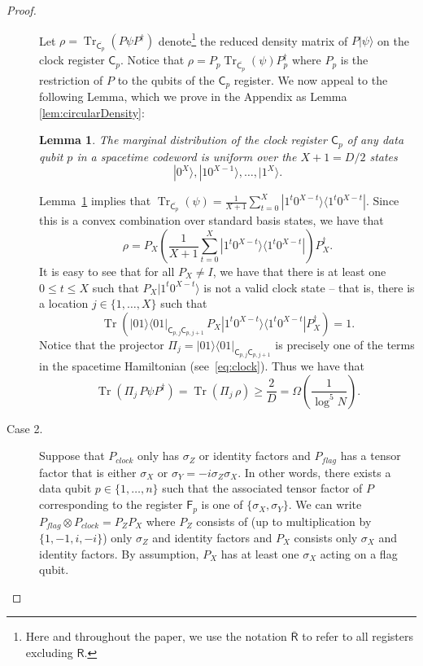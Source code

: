 \documentclass[11pt,letterpaper]{article}
\newtheorem{lemma}[theorem]{Lemma}
\theoremstyle{definition}
\theoremstyle{remark}
\newcommand{\Paren}[1]{\left(#1\right)}
\DeclareMathOperator{\Tr}{Tr}
\renewcommand{\leq}{\leqslant}
\renewcommand{\geq}{\geqslant}
\numberwithin{equation}{section}
\theoremstyle{definition}
\newcommand{\comp}[1]{\overline{#1}}
\newcommand{\ket}[1]{|#1\rangle}
\newcommand{\ketbra}[2]{|#1\rangle\! \langle #2|}
\newcommand{\sC}{{\mathsf{C}}}
\newcommand{\sF}{{\mathsf{F}}}
\newcommand{\sR}{{\mathsf{R}}}
\begin{document}
\begin{proof}
\begin{description}
%
  Let $\rho = \Tr_{\comp{\sC_p}}(P\psi P^\dagger)$ denote\footnote{Here and throughout the paper, we use the notation $\comp{\sR}$ to refer to all registers excluding $\sR$.} the reduced density matrix of $P\ket{\psi}$ on the clock register $\sC_p$. Notice that $\rho = P_p \Tr_{\comp{\sC_p}}(\psi) P_p^\dagger$ where $P_p$ is the restriction of $P$ to the qubits of the $\sC_p$ register. We now appeal to the following Lemma, which we prove in the Appendix as Lemma \ref{lem:circularDensity}:
  
  \begin{lemma}
  \label{lem:uniform_clock}
    The marginal distribution of the clock register $\sC_p$ of any data qubit $p$ in a spacetime codeword is uniform over the $X+1 = D/2$ states
    \begin{equation}
      \ket{0^X},\ket{10^{X-1}},\ldots,\ket{1^X}.
    \end{equation}
  \end{lemma}
  
  Lemma~\ref{lem:uniform_clock} implies that $\Tr_{\comp{\sC_p}}(\psi)  = \frac{1}{X+1} \sum_{t=0}^X \ketbra{1^t 0^{X-t}}{1^t 0^{X-t}}$. Since this is a convex combination over standard basis states, we have that
  \begin{equation}
    \rho = P_X \Paren{\frac{1}{X+1}\sum_{t=0}^X \ketbra{1^t 0^{X-t}}{1^t 0^{X-t}} } P_X^\dagger.
  \end{equation}
  It is easy to see that for all $P_X \neq I$, we have that there is at least one $0 \leq t \leq X$ such that $P_X \ket{1^t 0^{X-t}}$ is not a valid clock state -- that is, there is a location $j \in \{1,\ldots,X\}$ such that 
  \begin{equation}
    \Tr \Paren{ \ketbra{01}{01}_{\sC_{p,j} \sC_{p,j+1}} \, P_X \ketbra{1^t 0^{X-t}}{1^t 0^{X-t}} P_X^\dagger} = 1.
  \end{equation}
  Notice that the projector $\Pi_j = \ketbra{01}{01}_{\sC_{p,j}\sC_{p,j+1}}$ is precisely one of the terms in the spacetime Hamiltonian (see~\eqref{eq:clock}). Thus we have that
  \begin{equation}
    \Tr(\Pi_j \, P \psi P^\dagger) = \Tr( \Pi_j \, \rho) \geq \frac{2}{D} = \Omega \Paren{\frac{1}{\log^5 N}}.
  \end{equation} 
  
\item[Case 2.] Suppose that $P_{clock}$ only has $\sigma_Z$ or identity factors and $P_{flag}$ has a tensor factor that is either $\sigma_X$ or $\sigma_Y = -i\sigma_Z \sigma_X$. In other words, there exists a data qubit $p \in \{1,\ldots,n\}$ such that the associated tensor factor of $P$ corresponding to the register $\sF_p$ is one of $\{\sigma_X,\sigma_Y\}$. We can write $P_{flag} \otimes P_{clock} = P_Z P_X$ where $P_Z$ consists of (up to multiplication by $\{1,-1,i,-i\}$) only $\sigma_Z$ and identity factors and $P_X$ consists only $\sigma_X$ and identity factors. By assumption, $P_X$ has at least one $\sigma_X$ acting on a flag qubit.


\end{description}
\end{proof}
\end{document}
